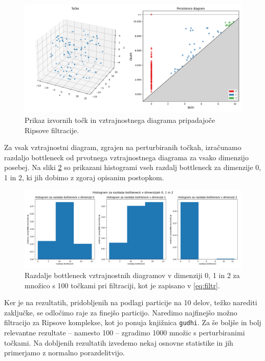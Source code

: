 \documentclass[a4paper,11pt]{article}
\theoremstyle{definition}
\theoremstyle{plain}
\begin{document}
\begin{figure}[ht!]
    \centering
    \includegraphics[width=150mm]{../slike/tocke3d_02_diagram.png}
    \caption{Prikaz izvornih točk in vztrajnostnega diagrama pripadajoče Ripsove filtracije.}
    \label{slika:tocke_diag}
\end{figure}
\noindent
Za vsak vztrajnostni diagram, zgrajen na perturbiranih točkah, izračunamo razdaljo bottleneck od prvotnega vztrajnostnega diagrama za vsako dimenzijo posebej.
Na sliki \ref{slika:10particij} so prikazani histogrami vseh razdalj bottleneck za dimenzije 0, 1 in 2, ki jih dobimo z zgoraj opisanim postopkom.

\begin{figure}[ht!]
    \centering
    \includegraphics[width=165mm]{../slike/bottleneck_pers02_100samples_10partpoints_dim012.png}
    \caption{Razdalje bottleneck vztrajnostnih diagramov v dimenziji 0, 1 in 2 za množico s 100 točkami pri filtraciji, kot je zapisano v \ref{eq:filtr}.}
    \label{slika:10particij}
\end{figure}

Ker je na rezultatih, pridobljenih na podlagi particije na 10 delov, težko narediti zaključke, se odločimo raje za finejšo particijo. 
Naredimo najfinejšo možno filtracijo za Ripsove komplekse, kot jo ponuja knjižnica \texttt{gudhi}. 
Za še boljše in bolj relevantne rezultate -- namesto 100 -- zgradimo 1000 množic s perturbiranimi točkami.
Na dobljenih rezultatih izvedemo nekaj osnovne statistike in jih primerjamo z normalno porazdelitvijo.
\\
\end{document}
